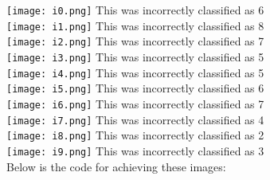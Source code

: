\documentclass{article}
\begin{document}
\texttt{[image: i0.png]}
\indent \indent \indent This was incorrectly classified as 6\\
\texttt{[image: i1.png]}
\indent \indent \indent This was incorrectly classified as 8\\
\texttt{[image: i2.png]}
\indent \indent \indent This was incorrectly classified as 7\\
\texttt{[image: i3.png]}
\indent \indent \indent This was incorrectly classified as 5\\
\texttt{[image: i4.png]}
\indent \indent \indent This was incorrectly classified as 5\\
\texttt{[image: i5.png]}
\indent \indent \indent This was incorrectly classified as 6\\
\texttt{[image: i6.png]}
\indent \indent \indent This was incorrectly classified as 7\\
\texttt{[image: i7.png]}
\indent \indent \indent This was incorrectly classified as 4\\
\texttt{[image: i8.png]}
\indent \indent \indent This was incorrectly classified as 2\\
\texttt{[image: i9.png]}
\indent \indent \indent This was incorrectly classified as 3\\
\indent Below is the code for achieving these images:
\end{document}
